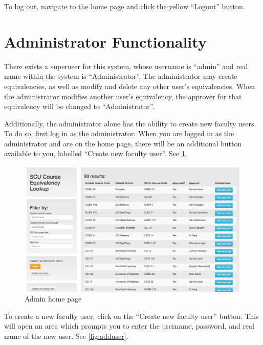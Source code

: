 \documentclass{article}
\begin{document}
\par To log out, navigate to the home page and click the yellow ``Logout'' button.

\section{Administrator Functionality}
\par There exists a superuser for this system, whose username is ``admin'' and
real name within the system is ``Administrator''. The administrator may create
equivalencies, as well as modify and delete any other user's equivalencies.
When the administrator modifies another user's equivalency, the approver for
that equivalency will be changed to ``Administrator''.

\par Additionally, the administrator alone has the ability to create new faculty
users. To do so, first log in as the administrator. When you are logged in as
the administrator and are on the home page, there will be an additional button
available to you, labelled ``Create new faculty user''. See \cref{fig:admin}.

\begin{figure}[h]
\includegraphics[width=15cm]{admin}
\centering
\caption{Admin home page}
\label{fig:admin}
\end{figure}

\par To create a new faculty user, click on the ``Create new faculty user''
button. This will open an area which prompts you to enter the username,
password, and real name of the new user. See \cref{fig:adduser}.
\end{document}
